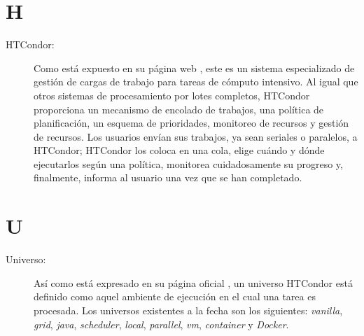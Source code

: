 \section*{H}
\begin{description}
	\item[HTCondor:] Como está expuesto en su página web \citep{HTCondor}, este es un sistema especializado de gestión de cargas de trabajo para tareas de cómputo intensivo. Al igual que otros sistemas de procesamiento por lotes completos, HTCondor proporciona un mecanismo de encolado de trabajos, una política de planificación, un esquema de prioridades, monitoreo de recursos y gestión de recursos. Los usuarios envían sus trabajos, ya sean seriales o paralelos, a HTCondor; HTCondor los coloca en una cola, elige cuándo y dónde ejecutarlos según una política, monitorea cuidadosamente su progreso y, finalmente, informa al usuario una vez que se han completado.
\end{description}

\section*{U}
\begin{description}
	\item[Universo:] Así como está expresado en su página oficial \citep{HTCondor}, un universo HTCondor está definido como aquel ambiente de ejecución en el cual una tarea es procesada. Los universos existentes a la fecha son los siguientes: \textit{vanilla}, \textit{grid}, \textit{java}, \textit{scheduler}, \textit{local}, \textit{parallel}, \textit{vm}, \textit{container} y \textit{Docker}.
\end{description}